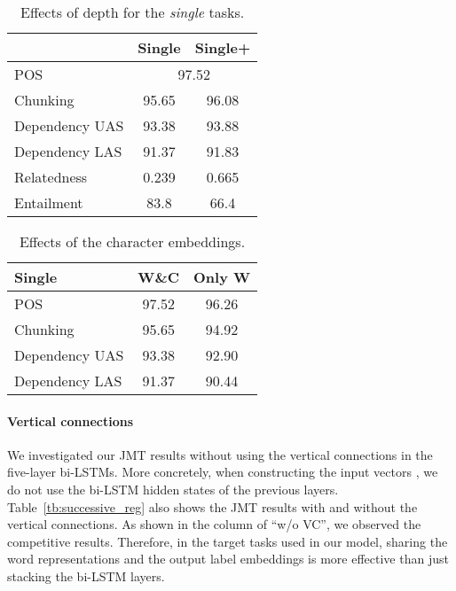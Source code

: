 \documentclass[11pt,a4paper]{article}
\begin{document}
\begin{table}[t]
{\scriptsize
	\begin{center}
	\begin{tabular}{l|cc}
  			   & Single & Single+ \\ \hline
    POS        & \multicolumn{2}{|c}{97.52} \\ \hline
    Chunking   & 95.65 & 96.08 \\ \hline
    Dependency UAS & 93.38 & 93.88 \\
    Dependency LAS & 91.37 & 91.83 \\ \hline
    Relatedness    & 0.239 & 0.665 \\ \hline
    Entailment     & 83.8  & 66.4 \\ \hline
  \end{tabular}
  \end{center}
}
    \caption{Effects of depth for the {\it single} tasks.}
    \label{tb:single_plus}
\end{table}

\begin{table}[t]
{\scriptsize
	\begin{center}
	\begin{tabular}{l|c|c}
 	Single 	   & W\&C & Only W \\ \hline
    POS        & 97.52 & 96.26 \\ \hline
    Chunking   & 95.65 & 94.92 \\ \hline
    Dependency UAS & 93.38 & 92.90 \\
    Dependency LAS & 91.37 & 90.44 \\ \hline
  \end{tabular}
  \end{center}
}
    \caption{Effects of the character embeddings.}
    \label{tb:char_comp}
\end{table}


\paragraph{Vertical connections}
We investigated our JMT results without using the vertical connections in the five-layer bi-LSTMs.
More concretely, when constructing the input vectors , we do not use the bi-LSTM hidden states of the previous layers.
Table~\ref{tb:successive_reg} also shows the JMT results with and without the vertical connections.
As shown in the column of ``w/o VC'', we observed the competitive results.
Therefore, in the target tasks used in our model, sharing the word representations and the output label embeddings is more effective than just stacking the bi-LSTM layers.
\end{document}
